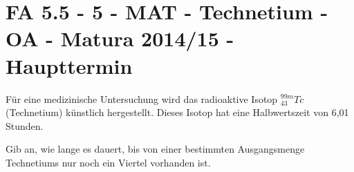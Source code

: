 \section{FA 5.5 - 5 - MAT - Technetium - OA - Matura 2014/15 - Haupttermin}

\begin{beispiel}[FA 5.5]{1} %
Für eine medizinische Untersuchung wird das radioaktive Isotop $^{99m}_{43}Tc$ \mbox{(Technetium)} künstlich hergestellt. Dieses Isotop hat eine Halbwertszeit von 6,01 Stunden. \leer

Gib an, wie lange es dauert, bis von einer bestimmten Ausgangsmenge Technetiums nur
noch ein Viertel vorhanden ist.

\end{beispiel}